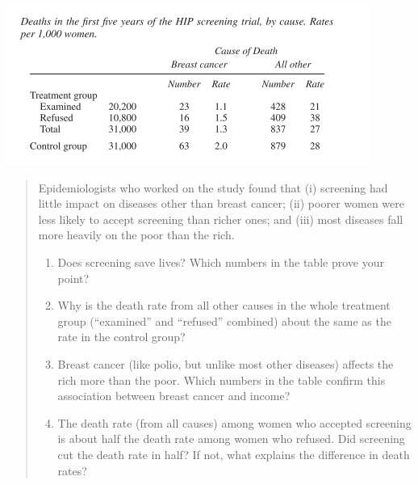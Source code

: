 \documentclass[
]{book}
\begin{document}
\includegraphics{images/Ch02Img04.png}

\begin{quote}
Epidemiologists who worked on the study found that (i) screening had little impact on diseases other than breast cancer; (ii) poorer women were less likely to accept screening than richer ones; and (iii) most diseases fall more heavily on the
poor than the rich.

\begin{enumerate}
\def\labelenumi{\alph{enumi}.}
\item
  Does screening save lives? Which numbers in the table prove your point?
\item
  Why is the death rate from all other causes in the whole treatment group (``examined'' and ``refused'' combined) about the same as the rate in the control group?
\item
  Breast cancer (like polio, but unlike most other diseases) affects the rich more than the poor. Which numbers in the table confirm this association between breast cancer and income?
\item
  The death rate (from all causes) among women who accepted screening is about half the death rate among women who refused. Did screening cut the death rate in half? If not, what explains the difference in death rates?
\end{enumerate}
\end{quote}
\end{document}
